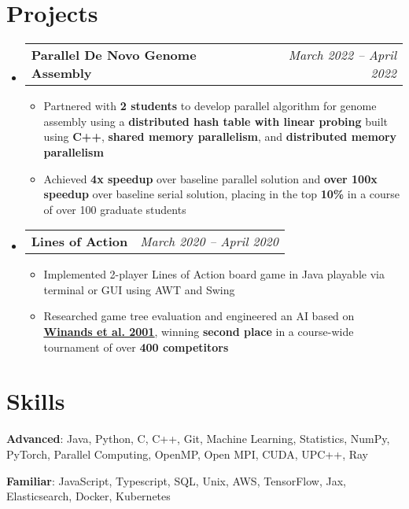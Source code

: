 \documentclass[letterpaper,11pt]{article}
\makeatletter
\newcommand{\ritem}[1]{
  \item\small{
    {#1 \vspace{-2pt}}
  }
}
\newcommand{\resumeProjectHeading}[2]{
  \vspace{-1pt}\item
    \begin{tabular*}{0.97\textwidth}[t]{l@{\extracolsep{\fill}}r}
      \textbf{#1} & \textit{\small #2} \\
    \end{tabular*}\vspace{-5pt}
}
\newcommand{\resumeSubHeadingListStart}{\begin{itemize}[leftmargin=*]}
\newcommand{\resumeSubHeadingListEnd}{\end{itemize}}
\newcommand{\resumeItemListStart}{\begin{itemize}}
\newcommand{\resumeItemListEnd}{\end{itemize}\vspace{-5pt}}
\makeatother
\begin{document}
\section{Projects}
  \resumeSubHeadingListStart
    \resumeProjectHeading{Parallel De Novo Genome Assembly}{March 2022 -- April 2022}
      \resumeItemListStart
        \ritem{Partnered with \textbf{2 students} to develop parallel algorithm for genome assembly using a \textbf{distributed hash table with linear probing} built using \textbf{C++}, \textbf{shared memory parallelism}, and \textbf{distributed memory parallelism}}
        \ritem{Achieved \textbf{4x speedup} over baseline parallel solution and \textbf{over 100x speedup} over baseline serial solution, placing in the top \textbf{10\%} in a course of over 100 graduate students}
      \resumeItemListEnd
  
    \resumeProjectHeading{Lines of Action}{March 2020 -- April 2020}
      \resumeItemListStart
        \ritem{Implemented 2-player Lines of Action board game in Java playable via terminal or GUI using AWT and Swing}
        \ritem{Researched game tree evaluation and engineered an AI based on \textbf{\underline{\href{http://citeseerx.ist.psu.edu/viewdoc/download?doi=10.1.1.4.3549&rep=rep1&type=pdf}{Winands et al. 2001}}}, winning \textbf{second place} in a course-wide tournament of over \textbf{400 competitors}}
      \resumeItemListEnd
    
  \resumeSubHeadingListEnd


\section{Skills}
    \textbf{Advanced}: Java, Python, C, C++, Git, Machine Learning, Statistics, NumPy, PyTorch, Parallel Computing, OpenMP, Open MPI, CUDA, UPC++, Ray
    
    \textbf{Familiar}: JavaScript, Typescript, SQL, Unix, AWS, TensorFlow, Jax, Elasticsearch, Docker, Kubernetes
\end{document}
